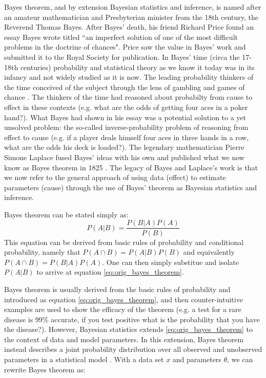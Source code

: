 Bayes theorem, and by extension Bayesian statistics and inference, is named after an amateur mathematician and Presbyterian minister from the 18th century, the Reverend Thomas Bayes. After Bayes' death, his friend Richard Price found an essay Bayes wrote titled ``an imperfect solution of one of the most difficult problems in the doctrine of chances". Price saw the value in Bayes' work and submitted it to the Royal Society for publication. In Bayes' time (circa the 17-18th centuries) probability and statistical theory as we know it today was in its infancy and not widely studied as it is now. The leading probability thinkers of the time conceived of the subject through the lens of gambling and games of chance \cite{David1998} \cite{Moivre1718}. The thinkers of the time had reasoned about probabilty from cause to effect in these contexts (e.g. what are the odds of getting four aces in a poker hand?). What Bayes had shown in his essay was a potential solution to a yet unsolved problem: the so-called inverse-probability problem of reasoning from effect to cause (e.g. if a player deals himself four aces in three hands in a row, what are the odds his deck is loaded?). The legendary mathematician Pierre Simone Laplace fused Bayes' ideas with his own and published what we now know as Bayes theorem in 1825 \cite{Stigler1986}. The legacy of Bayes and Laplace's work is that we now refer to the general approach of using data (effect) to estimate parameters (cause) through the use of Bayes' theorem as Bayesian statistics and inference.

Bayes theorem can be stated simply as:
\begin{equation} \label{eq:orig_bayes_theorem}
P(A|B) = \frac{P(B|A)P(A)}{P(B)}
\end{equation}
This equation can be derived from basic rules of probability and conditional probability, namely that $P(A \cap B) = P(A|B)P(B)$ and equivalently $P(A \cap B) = P(B|A)P(A)$. One can then simply substitue and isolate $P(A|B)$ to arrive at equation \ref{eq:orig_bayes_theorem}.

Bayes theorem is usually derived from the basic rules of probability and introduced as equation \ref{eq:orig_bayes_theorem}, and then counter-intuitive examples are used to show the efficacy of the theorem (e.g. a test for a rare disease is 99\% accurate, if you test positive what is the probability that you have the disease?). However, Bayesian statistics extends \ref{eq:orig_bayes_theorem} to the context of data and model parameters. In this extension, Bayes theorem instead describes a joint probability distribution over all observed and unobserved parameters in a statistical model \cite{Schoot2021}. With a data set $x$ and parameters $\theta$, we can rewrite Bayes theorem as:

